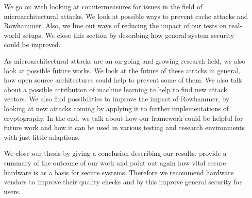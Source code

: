 We go on with looking at countermeasures for issues in the field of
microarchitectural attacks. We look at possible ways to prevent cache attacks
and Rowhammer. Also, we line out ways of reducing the impact of our tests on
real-world setups. We close this section by describing how general system
security could be improved.

As microarchitectural attacks are an on-going and growing research field, we
also look at possible future works. We look at the future of these attacks in
general, how open source architectures could help to prevent some of them. We
also talk about a possible attribution of machine learning to help to find new
attack vectors. We also find possibilities to improve the impact of Rowhammer,
by looking at new attacks coming by applying it to further implementations of
cryptography. In the end, we talk about how our framework could be helpful for
future work and how it can be used in various testing and research environments
with just little adaptions.

We close our thesis by giving a conclusion describing our results, provide a
summary of the outcome of our work and point out again how vital secure hardware
is as a basis for secure systems. Therefore we recommend hardware vendors to
improve their quality checks and by this improve general security for users.

